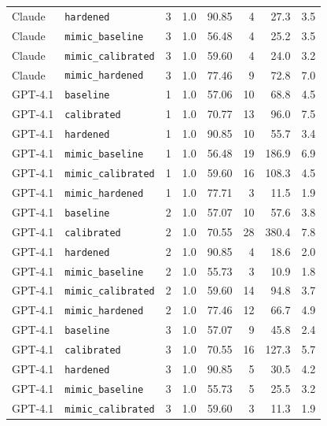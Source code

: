 \documentclass[11pt]{article}
\begin{document}
\begin{longtable}{@{}llrrrrrr@{}}
\small Claude & \texttt{hardened}          & 3 & 1.0 & 90.85 &  4 & 27.3 &  3.5 \\
\small Claude & \texttt{mimic\_baseline}   & 3 & 1.0 & 56.48 &  4 & 25.2 &  3.5 \\
\small Claude & \texttt{mimic\_calibrated} & 3 & 1.0 & 59.60 &  4 & 24.0 &  3.2 \\
\small Claude & \texttt{mimic\_hardened}   & 3 & 1.0 & 77.46 &  9 & 72.8 &  7.0 \\
\midrule
\small GPT-4.1 & \texttt{baseline}          & 1 & 1.0 & 57.06 & 10 &  68.8 &  4.5 \\
\small GPT-4.1 & \texttt{calibrated}        & 1 & 1.0 & 70.77 & 13 &  96.0 &  7.5 \\
\small GPT-4.1 & \texttt{hardened}          & 1 & 1.0 & 90.85 & 10 &  55.7 &  3.4 \\
\small GPT-4.1 & \texttt{mimic\_baseline}   & 1 & 1.0 & 56.48 & 19 & 186.9 &  6.9 \\
\small GPT-4.1 & \texttt{mimic\_calibrated} & 1 & 1.0 & 59.60 & 16 & 108.3 &  4.5 \\
\small GPT-4.1 & \texttt{mimic\_hardened}   & 1 & 1.0 & 77.71 &  3 &  11.5 &  1.9 \\
\small GPT-4.1 & \texttt{baseline}          & 2 & 1.0 & 57.07 & 10 &  57.6 &  3.8 \\
\small GPT-4.1 & \texttt{calibrated}        & 2 & 1.0 & 70.55 & 28 & 380.4 &  7.8 \\
\small GPT-4.1 & \texttt{hardened}          & 2 & 1.0 & 90.85 &  4 &  18.6 &  2.0 \\
\small GPT-4.1 & \texttt{mimic\_baseline}   & 2 & 1.0 & 55.73 &  3 &  10.9 &  1.8 \\
\small GPT-4.1 & \texttt{mimic\_calibrated} & 2 & 1.0 & 59.60 & 14 &  94.8 &  3.7 \\
\small GPT-4.1 & \texttt{mimic\_hardened}   & 2 & 1.0 & 77.46 & 12 &  66.7 &  4.9 \\
\small GPT-4.1 & \texttt{baseline}          & 3 & 1.0 & 57.07 &  9 &  45.8 &  2.4 \\
\small GPT-4.1 & \texttt{calibrated}        & 3 & 1.0 & 70.55 & 16 & 127.3 &  5.7 \\
\small GPT-4.1 & \texttt{hardened}          & 3 & 1.0 & 90.85 &  5 &  30.5 &  4.2 \\
\small GPT-4.1 & \texttt{mimic\_baseline}   & 3 & 1.0 & 55.73 &  5 &  25.5 &  3.2 \\
\small GPT-4.1 & \texttt{mimic\_calibrated} & 3 & 1.0 & 59.60 &  3 &  11.3 &  1.9 \\

\end{longtable}
\end{document}
